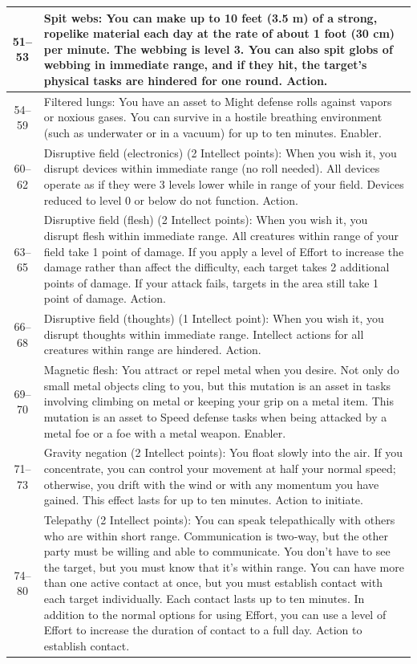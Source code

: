 \begin{longtable}{| c | p{15cm} |}
 51–53 & Spit webs: You can make up to 10 feet (3.5 m) of a strong, ropelike material each day at the rate of about 1 foot (30 cm) per minute. The webbing is level 3. You can also spit globs of webbing in immediate range, and if they hit, the target’s physical tasks are hindered for one round. Action. \\ \hline
 54–59 & Filtered lungs: You have an asset to Might defense rolls against vapors or noxious gases. You can survive in a hostile breathing environment (such as underwater or in a vacuum) for up to ten minutes. Enabler. \\ \hline
 60–62 & Disruptive field (electronics) (2 Intellect points): When you wish it, you disrupt devices within immediate range (no roll needed). All devices operate as if they were 3 levels lower while in range of your field. Devices reduced to level 0 or below do not function. Action. \\ \hline
 63–65 & Disruptive field (flesh) (2 Intellect points): When you wish it, you disrupt flesh within immediate range. All creatures within range of your field take 1 point of damage. If you apply a level of Effort to increase the damage rather than affect the difficulty, each target takes 2 additional points of damage. If your attack fails, targets in the area still take 1 point of damage. Action. \\ \hline
 66–68 & Disruptive field (thoughts) (1 Intellect point): When you wish it, you disrupt thoughts within immediate range. Intellect actions for all creatures within range are hindered. Action. \\ \hline
 69–70 & Magnetic flesh: You attract or repel metal when you desire. Not only do small metal objects cling to you, but this mutation is an asset in tasks involving climbing on metal or keeping your grip on a metal item. This mutation is an asset to Speed defense tasks when being attacked by a metal foe or a foe with a metal weapon. Enabler. \\ \hline
 71–73 & Gravity negation (2 Intellect points): You float slowly into the air. If you concentrate, you can control your movement at half your normal speed; otherwise, you drift with the wind or with any momentum you have gained. This effect lasts for up to ten minutes. Action to initiate. \\ \hline
 74–80 & Telepathy (2 Intellect points): You can speak telepathically with others who are within short range. Communication is two‑way, but the other party must be willing and able to communicate. You don’t have to see the target, but you must know that it’s within range. You can have more than one active contact at once, but you must establish contact with each target individually. Each contact lasts up to ten minutes. In addition to the normal options for using Effort, you can use a level of Effort to increase the duration of contact to a full day. Action to establish contact. \\ \hline

\end{longtable}
